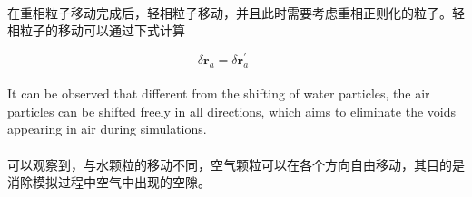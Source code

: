 \documentclass[UTF8]{ctexart}
\begin{document}
\paragraph{\quad}在重相粒子移动完成后，轻相粒子移动，并且此时需要考虑重相正则化的粒子。轻相粒子的移动可以通过下式计算


\begin{equation}
   \delta \mathbf{r}_a = \delta \mathbf{r}_a^{'}  \qquad 
\end{equation}

\paragraph{\quad}It can be observed that different from the shifting of water particles, the air particles 
                    can be shifted freely in all directions, which aims to eliminate the voids appearing 
                    in air during simulations.
\paragraph{\quad}可以观察到，与水颗粒的移动不同，空气颗粒可以在各个方向自由移动，其目的是消除模拟过程中空气中出现的空隙。
\end{document}
